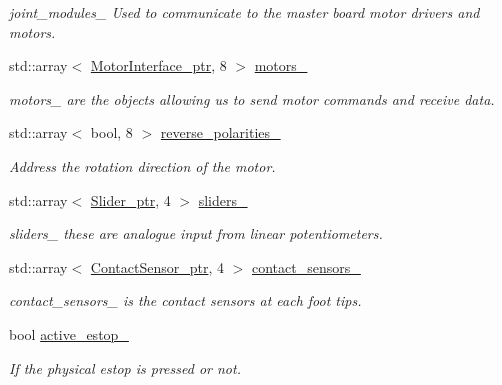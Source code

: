 \begin{DoxyCompactItemize}
\begin{DoxyCompactList}\small\item\em joint\+\_\+modules\+\_\+ Used to communicate to the master board motor drivers and motors. \end{DoxyCompactList}\item 
std\+::array$<$ \hyperlink{common__header_8hpp_ae1a0f9992bc8fbbc1943d887f517c180}{Motor\+Interface\+\_\+ptr}, 8 $>$ \hyperlink{classblmc__robots_1_1Solo8_a4d0b9f094d69f0acbdcbc7728df6ecd4}{motors\+\_\+}\hypertarget{classblmc__robots_1_1Solo8_a4d0b9f094d69f0acbdcbc7728df6ecd4}{}\label{classblmc__robots_1_1Solo8_a4d0b9f094d69f0acbdcbc7728df6ecd4}

\begin{DoxyCompactList}\small\item\em motors\+\_\+ are the objects allowing us to send motor commands and receive data. \end{DoxyCompactList}\item 
std\+::array$<$ bool, 8 $>$ \hyperlink{classblmc__robots_1_1Solo8_af8e3d6a86608540f39bf1de1f052266a}{reverse\+\_\+polarities\+\_\+}\hypertarget{classblmc__robots_1_1Solo8_af8e3d6a86608540f39bf1de1f052266a}{}\label{classblmc__robots_1_1Solo8_af8e3d6a86608540f39bf1de1f052266a}

\begin{DoxyCompactList}\small\item\em Address the rotation direction of the motor. \end{DoxyCompactList}\item 
std\+::array$<$ \hyperlink{common__header_8hpp_a4cb9a95e8b2c0bf237ce29f5252c7b73}{Slider\+\_\+ptr}, 4 $>$ \hyperlink{classblmc__robots_1_1Solo8_a4f372b7f79a81142a4e99e1ae6da44a2}{sliders\+\_\+}\hypertarget{classblmc__robots_1_1Solo8_a4f372b7f79a81142a4e99e1ae6da44a2}{}\label{classblmc__robots_1_1Solo8_a4f372b7f79a81142a4e99e1ae6da44a2}

\begin{DoxyCompactList}\small\item\em sliders\+\_\+ these are analogue input from linear potentiometers. \end{DoxyCompactList}\item 
std\+::array$<$ \hyperlink{common__header_8hpp_ac78fe5c68e56a3b884117109959e4d58}{Contact\+Sensor\+\_\+ptr}, 4 $>$ \hyperlink{classblmc__robots_1_1Solo8_a67076041a87ea12b1a22d7f1759c759e}{contact\+\_\+sensors\+\_\+}
\begin{DoxyCompactList}\small\item\em contact\+\_\+sensors\+\_\+ is the contact sensors at each foot tips. \end{DoxyCompactList}\item 
bool \hyperlink{classblmc__robots_1_1Solo8_a25153421bca095a344408e055f3794b6}{active\+\_\+estop\+\_\+}
\begin{DoxyCompactList}\small\item\em If the physical estop is pressed or not. \end{DoxyCompactList}\end{DoxyCompactItemize}
